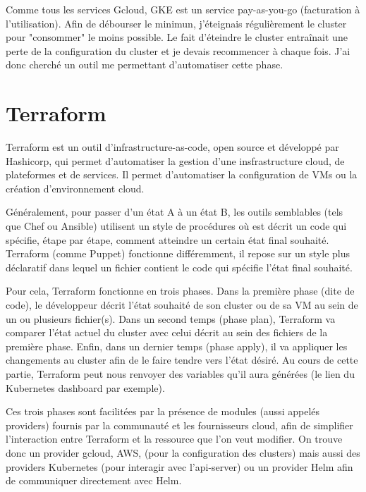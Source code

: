 \documentclass[11pt,fleqn]{book} %
\begin{document}
Comme tous les services Gcloud, GKE est un service pay-as-you-go (facturation à l’utilisation). Afin de débourser le minimun, j'éteignais régulièrement le cluster pour "consommer" le moins possible. Le fait d'éteindre le cluster entraînait une perte de la configuration du cluster et je devais recommencer à chaque fois. J'ai donc cherché un outil me permettant d'automatiser cette phase.

\section*{Terraform}
Terraform est un outil d'infrastructure-as-code, open source et développé par Hashicorp, qui permet d'automatiser la gestion d'une insfrastructure cloud, de plateformes et de services. Il permet d'automatiser la configuration de VMs ou la création d'environnement cloud. \newline

Généralement, pour passer d'un état A à un état B, les outils semblables (tels que Chef ou Ansible) utilisent un style de procédures où est décrit un code qui spécifie, étape par étape, comment atteindre un certain état final souhaité. Terraform (comme Puppet) fonctionne différemment, il repose sur un style plus déclaratif dans lequel un fichier contient le code qui spécifie l'état final souhaité. \newline

Pour cela, Terraform fonctionne en trois phases. Dans la première phase (dite de code), le développeur décrit l'état souhaité de son cluster ou de sa VM au sein de un ou plusieurs fichier(s). Dans un second temps (phase plan), Terraform va comparer l'état actuel du cluster avec celui décrit au sein des fichiers de la première phase. Enfin, dans un dernier temps (phase apply), il va appliquer les changements au cluster afin de le faire tendre vers l'état désiré. Au cours de cette partie, Terraform peut nous renvoyer des variables qu'il aura générées (le lien du Kubernetes dashboard par exemple).\newline

Ces trois phases sont facilitées par la présence de modules (aussi appelés providers) fournis par la communauté et les fournisseurs cloud, afin de simplifier l'interaction entre Terraform et la ressource que l'on veut modifier. On trouve donc un provider gcloud, AWS, (pour la configuration des clusters) mais aussi des providers Kubernetes (pour interagir avec l'api-server) ou un provider Helm afin de communiquer directement avec Helm.\newline
\end{document}

